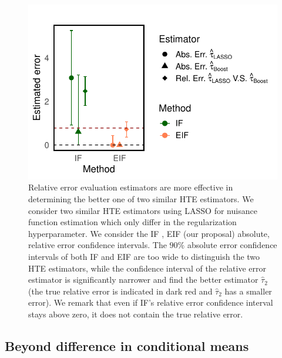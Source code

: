 \documentclass{article}
\theoremstyle{plain}
\theoremstyle{definition}
\theoremstyle{plain}
\begin{document}
\begin{figure}[h]
        \centering
        \begin{minipage}{0.5\textwidth}
                \centering
                \includegraphics[clip, trim = 0cm 0cm 0cm 0cm, width = \textwidth]{plot/similar_HTE_estimator_LASSO.pdf}
        \end{minipage}
        \caption{
        Relative error evaluation estimators are more effective in determining the better one of two similar HTE estimators.
        We consider two similar HTE estimators using LASSO for nuisance function estimation which only differ in the regularization hyperparameter. 
        We consider the IF \parencite{alaa2019validating}, EIF (our proposal) absolute, relative error confidence intervals.
        The $90\%$ absolute error confidence intervals of both IF and EIF are too wide to distinguish the two HTE estimators, while the confidence interval of the relative error estimator is significantly narrower and find the better estimator $\hat{\tau}_2$ (the true relative error is indicated in dark red and $\hat{\tau}_2$ has a smaller error).
        We remark that even if IF's relative error confidence interval stays above zero, it does not contain the true relative error.
        }
    \label{fig:similar HTE estimator}
\end{figure}


\subsection{Beyond difference in conditional means}\label{rmk:DINA}
\end{document}
